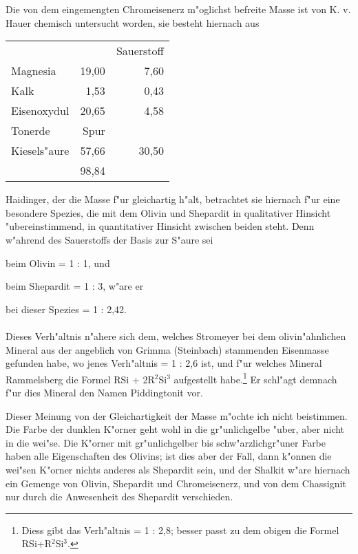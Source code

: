 \documentclass[a4paper, 11pt, oneside, german]{article}
\begin{document}
Die von dem eingemengten Chromeisenerz m"oglichst befreite Masse ist von K. v. Hauer chemisch untersucht worden, sie besteht hiernach aus
\begin{center}
\begin{tabular}{ l r r }
     & & Sauerstoff\\
    Magnesia & 19,00 & 7,60\\
    Kalk & 1,53 & 0,43\\
    Eisenoxydul & 20,65 & 4,58\\
    Tonerde & Spur & \\
    Kiesels"aure & 57,66 & 30,50\\
     & 98,84\\
\end{tabular}
\end{center}
Haidinger, der die Masse f"ur gleichartig h"alt, betrachtet sie hiernach f"ur eine besondere Spezies, die mit dem Olivin und Shepardit in qualitativer Hinsicht "ubereinstimmend, in quantitativer Hinsicht zwischen beiden steht. Denn w"ahrend des Sauerstoffs der Basis zur S"aure sei
\begin{center}
beim Olivin = 1 : 1, und  
\end{center}
\begin{center}
beim Shepardit = 1 : 3, w"are er  
\end{center}
\begin{center}
bei dieser Spezies = 1 : 2,42.  
\end{center}
\paragraph{}
Dieses Verh"altnis n"ahere sich dem, welches Stromeyer bei dem olivin"ahnlichen Mineral aus der angeblich von Grimma (Steinbach) stammenden Eisenmasse gefunden habe, wo jenes Verh"altnis = 1 : 2,6 ist, und f"ur welches Mineral Rammelsberg die Formel RSi + 2R$^{2}$Si$^{3}$ aufgestellt habe.\footnote{Diess gibt das Verh"altnis = 1 : 2,8; besser passt zu dem obigen die Formel RSi+R$^{2}$Si$^{3}$.} Er schl"agt demnach f"ur dies Mineral den Namen Piddingtonit vor.

Dieser Meinung von der Gleichartigkeit der Masse m"ochte ich nicht beistimmen. Die Farbe der dunklen K"orner geht wohl in die gr"unlichgelbe "uber, aber nicht in die wei"se. Die K"orner mit gr"unlichgelber bis schw"arzlichgr"uner Farbe haben alle Eigenschaften des Olivins; ist dies aber der Fall, dann k"onnen die wei"sen K"orner nichts anderes als Shepardit sein, und der Shalkit w"are hiernach ein Gemenge von Olivin, Shepardit und Chromeisenerz, und von dem Chassignit nur durch die Anwesenheit des Shepardit verschieden.
\end{document}
